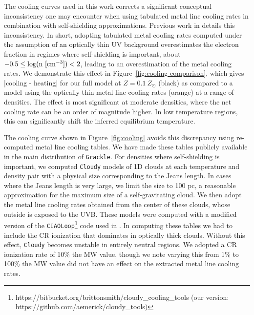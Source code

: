 \documentclass[twocolumn]{aastex61}
\begin{document}
The cooling curves used in this work corrects a significant conceptual inconsistency one may encounter when using tabulated metal line cooling rates in combination with self-shielding approximations. Previous work in \citet{Hu2017} details this inconsistency. In short, adopting tabulated metal cooling rates computed under the assumption of an optically thin UV background overestimates the electron fraction in regimes where self-shielding is important, about $-0.5 \leq \rm{log(n~[cm^{-3}])} < 2$, leading to an overestimation of the metal cooling rates. We demonstrate this effect in Figure~\ref{fig:cooling comparison}, which gives |cooling - heating| for our full model at $Z = 0.1~Z_{\odot}$ (black) as compared to a model using the optically thin metal line cooling rates (orange) at a range of densities. The effect is most significant at moderate densities, where the net cooling rate can be an order of magnitude higher. In low temperature regions, this can significantly shift the inferred equilibrium temperature.

The cooling curve shown in Figure~\ref{fig:cooling} avoids this discrepancy using re-computed metal line cooling tables. We have made these tables publicly available in the main distribution of \texttt{Grackle}. For densities where self-shielding is important, we computed \texttt{Cloudy} models of 1D clouds at each temperature and density pair with a physical size corresponding to the Jeans length. In cases where the Jeans length is very large, we limit the size to 100 pc, a reasonable approximation for the maximum size of a self-gravitating cloud. We then adopt the metal line cooling rates obtained from the center of these clouds, whose outside is exposed to the UVB. These models were computed with a modified version of the \texttt{CIAOLoop}\footnote{https://bitbucket.org/brittonsmith/cloudy\_cooling\_tools (our version: https://github.com/aemerick/cloudy\_tools)} code used in \citet{2008MNRAS.385.1443S}. In computing these tables we had to include the CR ionization that dominates in optically thick clouds. Without this effect, \texttt{Cloudy} becomes unstable in entirely neutral regions. We adopted a CR ionization rate of 10\% the MW value, though we note varying this from 1\% to 100\% the MW value did not have an effect on the extracted metal line cooling rates. 
\end{document}
